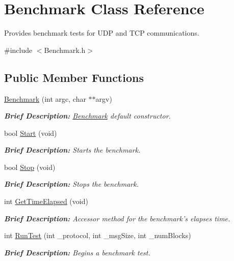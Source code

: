 \hypertarget{class_benchmark}{\section{Benchmark Class Reference}
\label{class_benchmark}
}


Provides benchmark tests for U\-D\-P and T\-C\-P communications.  




{\ttfamily \#include $<$Benchmark.\-h$>$}

\subsection*{Public Member Functions}
\begin{DoxyCompactItemize}
\item 
\hyperlink{class_benchmark_a136c0926fa65758b23a5e162eaa0e68b}{Benchmark} (int argc, char $\ast$$\ast$argv)
\begin{DoxyCompactList}\small\item\em {\bfseries Brief Description\-:} \hyperlink{class_benchmark}{Benchmark} default constructor. \end{DoxyCompactList}\item 
bool \hyperlink{class_benchmark_a824761ac867dc7f643b647924dba5cc4}{Start} (void)
\begin{DoxyCompactList}\small\item\em {\bfseries Brief Description\-:} Starts the benchmark. \end{DoxyCompactList}\item 
bool \hyperlink{class_benchmark_a13a1597b06c2cc084cdacdb5cbd5a6a4}{Stop} (void)
\begin{DoxyCompactList}\small\item\em {\bfseries Brief Description\-:} Stops the benchmark. \end{DoxyCompactList}\item 
int \hyperlink{class_benchmark_ab4e9d938830b807398f21078a15ef463}{Get\-Time\-Elapsed} (void)
\begin{DoxyCompactList}\small\item\em {\bfseries Brief Description\-:} Accessor method for the benchmark's elapses time. \end{DoxyCompactList}\item 
int \hyperlink{class_benchmark_a291165d2e0dee12a522ec56c8e1429b2}{Run\-Test} (int \-\_\-protocol, int \-\_\-msg\-Size, int \-\_\-num\-Blocks)
\begin{DoxyCompactList}\small\item\em {\bfseries Brief Description\-:} Begins a benchmark test. \end{DoxyCompactList}\item 
$$
\end{DoxyCompactItemize}
